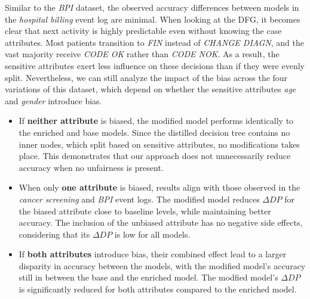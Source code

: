 Similar to the \textit{BPI} dataset, the observed accuracy differences between models in the \textit{hospital billing} event log are minimal.
When looking at the DFG, it becomes clear that next activity is highly predictable even without knowing the case attributes.
Most patients transition to \textit{FIN} instead of \textit{CHANGE DIAGN},
and the vast majority receive \textit{CODE OK} rather than \textit{CODE NOK}.
As a result, the sensitive attributes exert less influence on these decisions than if they were evenly split.
Nevertheless, we can still analyze the impact of the bias across the four variations of this dataset,
which depend on whether the sensitive attributes \textit{age} and \textit{gender} introduce bias.
\begin{itemize}
\setlength{\itemsep}{0pt}
    \item If \textbf{neither attribute} is biased, the modified model performs identically to the enriched and base models.
        Since the distilled decision tree contains no inner nodes, which split based on sensitive attributes,
        no modifications takes place.
        This demonstrates that our approach does not unnecessarily reduce accuracy when no unfairness is present.
    \item When only \textbf{one attribute} is biased,
        results align with those observed in the \textit{cancer screening} and \textit{BPI} event logs.
        The modified model reduces $\Delta \textit{DP}$ for the biased attribute close to baseline levels, while maintaining better accuracy.
        The inclusion of the unbiased attribute has no negative side effects,
        considering that its $\Delta \textit{DP}$ is low for all models.
    \item If \textbf{both attributes} introduce bias, their combined effect lead to a larger disparity in accuracy between the models,
        with the modified model's accuracy still in between the base and the enriched model.
        The modfied model's $\Delta \textit{DP}$ is significantly reduced for both attributes compared to the enriched model.
\end{itemize}

